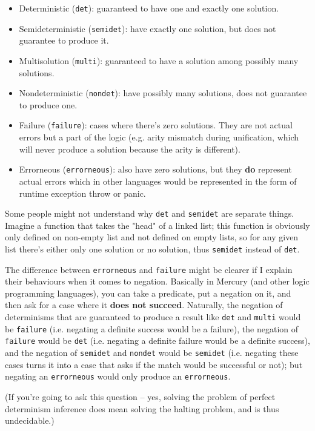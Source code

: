 \begin{itemize}
	\item Deterministic (\texttt{det}): guaranteed to have one and exactly one solution.
	\item Semideterministic (\texttt{semidet}): have exactly one solution, but does not guarantee to produce it.
	\item Multisolution (\texttt{multi}): guaranteed to have a solution among possibly many solutions.
	\item Nondeterministic (\texttt{nondet}): have possibly many solutions, does not guarantee to produce one.
	\item Failure (\texttt{failure}): cases where there's zero solutions. They are not actual errors but a part of the logic (e.g. arity mismatch during unification, which will never produce a solution because the arity is different).
	\item Errorneous (\texttt{errorneous}): also have zero solutions, but they \textbf{do} represent actual errors which in other languages would be represented in the form of runtime exception throw or panic.
\end{itemize}

Some people might not understand why \texttt{det} and \texttt{semidet} are separate things. Imagine a function that takes the "head" of a linked list; this function is obviously only defined on non-empty list and not defined on empty lists, so for any given list there's either only one solution or no solution, thus \texttt{semidet} instead of \texttt{det}.

The difference between \texttt{errorneous} and \texttt{failure} might be clearer if I explain their behaviours when it comes to negation. Basically in Mercury (and other logic programming languages), you can take a predicate, put a negation on it, and then ask for a case where it \textbf{does not succeed}. Naturally, the negation of determinisms that are guaranteed to produce a result like \texttt{det} and \texttt{multi} would be \texttt{failure} (i.e. negating a definite success would be a failure), the negation of \texttt{failure} would be \texttt{det} (i.e. negating a definite failure would be a definite success), and the negation of \texttt{semidet} and \texttt{nondet} would be \texttt{semidet} (i.e. negating these cases turns it into a case that asks if the match would be successful or not); but negating an \texttt{errorneous} would only produce an \texttt{errorneous}.

(If you're going to ask this question -- yes, solving the problem of perfect determinism inference does mean solving the halting problem, and is thus undecidable.)

